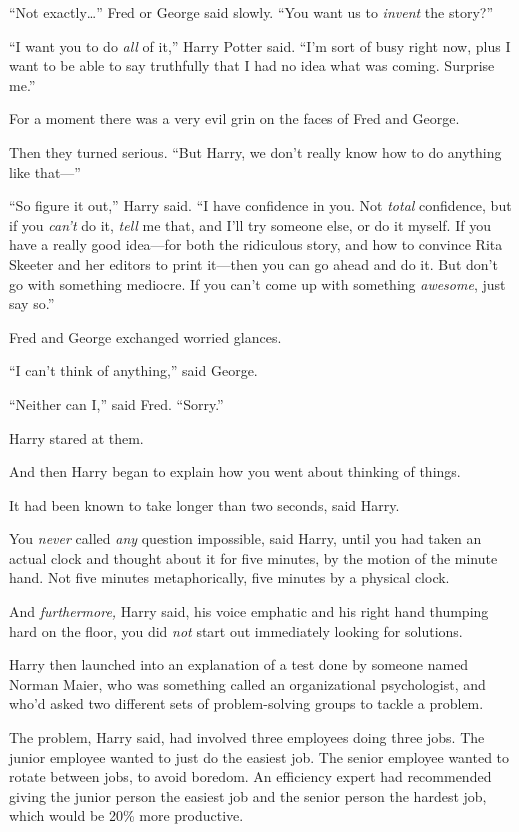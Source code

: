 “Not exactly…” Fred or George said slowly. “You want us to \emph{invent} the story?”

“I want you to do \emph{all} of it,” Harry Potter said. “I’m sort of busy right now, plus I want to be able to say truthfully that I had no idea what was coming. Surprise me.”

For a moment there was a very evil grin on the faces of Fred and George.

Then they turned serious. “But Harry, we don’t really know how to do anything like that—”

“So figure it out,” Harry said. “I have confidence in you. Not \emph{total} confidence, but if you \emph{can’t} do it, \emph{tell} me that, and I’ll try someone else, or do it myself. If you have a really good idea—for both the ridiculous story, and how to convince Rita Skeeter and her editors to print it—then you can go ahead and do it. But don’t go with something mediocre. If you can’t come up with something \emph{awesome}, just say so.”

Fred and George exchanged worried glances.

“I can’t think of anything,” said George.

“Neither can I,” said Fred. “Sorry.”

Harry stared at them.

And then Harry began to explain how you went about thinking of things.

It had been known to take longer than two seconds, said Harry.

You \emph{never} called \emph{any} question impossible, said Harry, until you had taken an actual clock and thought about it for five minutes, by the motion of the minute hand. Not five minutes metaphorically, five minutes by a physical clock.

And \emph{furthermore,} Harry said, his voice emphatic and his right hand thumping hard on the floor, you did \emph{not} start out immediately looking for solutions.

Harry then launched into an explanation of a test done by someone named Norman Maier, who was something called an organizational psychologist, and who’d asked two different sets of problem-solving groups to tackle a problem.

The problem, Harry said, had involved three employees doing three jobs. The junior employee wanted to just do the easiest job. The senior employee wanted to rotate between jobs, to avoid boredom. An efficiency expert had recommended giving the junior person the easiest job and the senior person the hardest job, which would be 20\% more productive.

